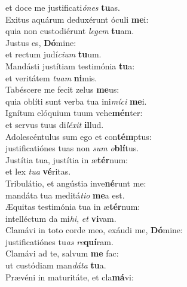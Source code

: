 \oddverse et doce me justificati\textit{ó}\textit{nes} \textbf{tu}as.\\
\evenverse Exitus aquárum deduxérunt óculi \textbf{me}i:~\*\\
\evenverse quia non custodiérunt \textit{le}\textit{gem} \textbf{tu}am.\\
\oddverse Justus es, \textbf{Dó}mine:~\*\\
\oddverse et rectum judí\textit{ci}\textit{um} \textbf{tu}um.\\
\evenverse Mandásti justítiam testimónia \textbf{tu}a:~\*\\
\evenverse et veritátem \textit{tu}\textit{am} \textbf{ni}mis.\\
\oddverse Tabéscere me fecit zelus \textbf{me}us:~\*\\
\oddverse quia oblíti sunt verba tua ini\textit{mí}\textit{ci} \textbf{me}i.\\
\evenverse Ignítum elóquium tuum vehe\textbf{mén}ter:~\*\\
\evenverse et servus tuus di\textit{lé}\textit{xit} \textbf{il}lud.\\
\oddverse Adolescéntulus sum ego et con\textbf{tém}ptus:~\*\\
\oddverse justificatiónes tuas non \textit{sum} \textit{o}\textbf{blí}tus.\\
\evenverse Justítia tua, justítia in æ\textbf{tér}num:~\*\\
\evenverse et lex \textit{tu}\textit{a} \textbf{vé}ritas.\\
\oddverse Tribulátio, et angústia inve\textbf{né}runt me:~\*\\
\oddverse mandáta tua meditá\textit{ti}\textit{o} \textbf{me}a est.\\
\evenverse Æquitas testimónia tua in æ\textbf{tér}num:~\*\\
\evenverse intelléctum da mi\textit{hi}, \textit{et} \textbf{vi}vam.\\
\oddverse Clamávi in toto corde meo, exáudi me, \textbf{Dó}mine:~\*\\
\oddverse justificatiónes tu\textit{as} \textit{re}\textbf{quí}ram.\\
\evenverse Clamávi ad te, salvum \textbf{me} fac:~\*\\
\evenverse ut custódiam man\textit{dá}\textit{ta} \textbf{tu}a.\\
\oddverse Prævéni in maturitáte, et cla\textbf{má}vi:~\*\\
